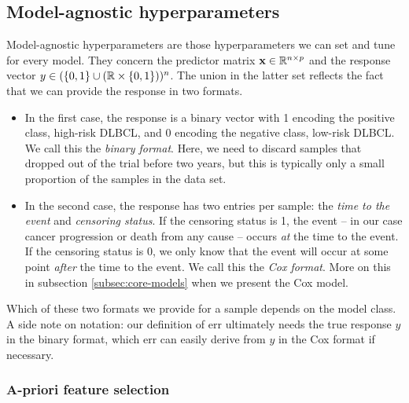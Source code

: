 \subsection{Model-agnostic hyperparameters}\label{subsec:model-agnostic}

Model-agnostic hyperparameters are those hyperparameters we can set and tune for every model. They 
concern the predictor matrix $\mathbf{x} \in \mathbb{R}^{n \times p}$ and the response vector $y \in 
(\{0, 1\} \cup (\mathbb{R} \times \{ 0, 1 \}))^n$. The union in the latter set reflects the fact that we
can provide the response in two formats. 
\begin{itemize}
    \item In the first case, the response is a binary vector with 1 encoding the positive class, 
        high-risk DLBCL, and 0 encoding the negative class, low-risk DLBCL. We call this the 
        \textit{binary format}. Here, we need to discard samples that dropped out of the trial 
        before two years, but this is typically only a small proportion of the samples in the data 
        set. 
    \item In the second case, the response has two entries per sample: the \textit{time to the 
        event} and \textit{censoring status}. If the censoring status is 1, the event -- in our case 
        cancer progression or death from any cause -- occurs \textit{at} the time to the event. If 
        the censoring status is 0, 
        we only know that the event will occur at some point \textit{after} the time to the event.
        We call this the \textit{Cox format}. More on this in subsection \ref{subsec:core-models} 
        when we present the Cox model. 
\end{itemize}

Which of these two formats we provide for a sample 
depends on the model class. A side note on notation: our definition of $\text{err}$ ultimately 
needs the true response $y$ in the binary format, which $\text{err}$ can easily derive from $y$ in 
the Cox format if necessary.

\subsubsection{A-priori feature selection}

